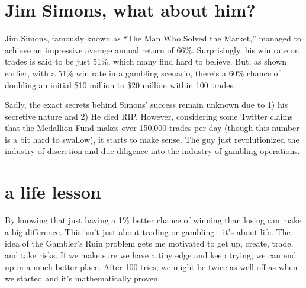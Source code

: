 \documentclass{article}
\begin{document}
\section{Jim Simons, what about him?}
Jim Simons, famously known as “The Man Who Solved the Market,” managed to achieve an impressive average annual return of 66\%. Surprisingly, his win rate on trades is said to be just 51\%, which many find hard to believe. But, as shown earlier, with a 51\% win rate in a gambling scenario, there’s a 60\% chance of doubling an initial \$10 million to \$20 million within 100 trades.

Sadly, the exact secrets behind Simons’ success remain unknown due to 1) his secretive nature and 2) He died RIP. However, considering some Twitter claims that the Medallion Fund makes over 150,000 trades per day (though this number is a bit hard to swallow), it starts to make sense. The guy just revolutionized the industry of discretion and due diligence into the industry of gambling operations.



\section{a life lesson}
By knowing that just having a 1\% better chance of winning than losing can make a big difference. This isn’t just about trading or gambling—it’s about life. The idea of the Gambler’s Ruin problem gets me motivated to get up, create, trade, and take risks. If we make sure we have a tiny edge and keep trying, we can end up in a much better place. After 100 tries, we might be twice as well off as when we started and it's mathematically proven.
\end{document}
